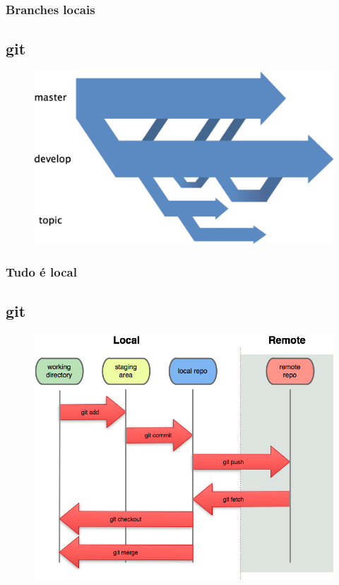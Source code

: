 \documentclass{beamer}
\begin{document}
  \begin{frame}
    \frametitle{Branches locais}
    \subsection{git}
    \begin{figure}[htb]
     \begin{center}
    	\includegraphics[scale=0.7]{branches.png}
     \end{center}
    \end{figure}
    \vfill
  \end{frame}

  \begin{frame}
    \frametitle{Tudo é local}
    \subsection{git}
    \begin{figure}[htb]
     \begin{center}
    	\includegraphics[scale=0.5]{local-remote.png}
     \end{center}
    \end{figure}
    \vfill
  \end{frame}
\end{document}
